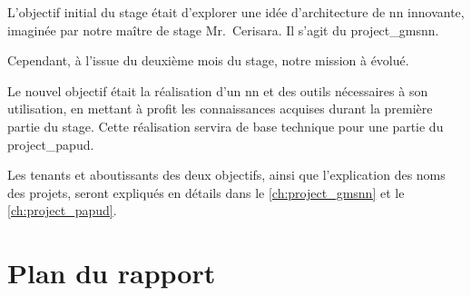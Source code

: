 L'objectif initial du stage était d'explorer une idée d'architecture de \gls{nn} innovante, imaginée par notre maître de stage Mr.~Cerisara. Il s'agit du \gls{project_gmsnn}.

Cependant, à l'issue du deuxième mois du stage, notre mission à évolué.

Le nouvel objectif était la réalisation d'un \gls{nn} et des outils nécessaires à son utilisation, en mettant à profit les connaissances acquises durant la première partie du stage.
Cette réalisation servira de base technique pour une partie du \gls{project_papud}.

Les tenants et aboutissants des deux objectifs, ainsi que l'explication des noms des projets, seront expliqués en détails dans le \autoref{ch:project_gmsnn} et le \autoref{ch:project_papud}.



\section[Plan]{Plan du rapport}

%
%
%
%
%

